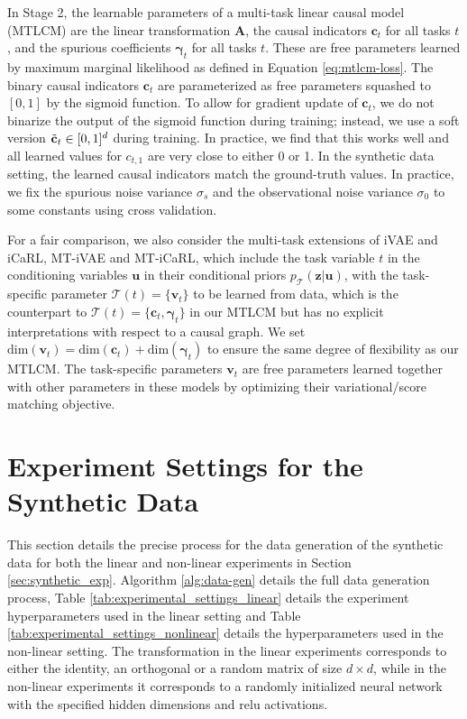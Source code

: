 \documentclass[10pt]{article} %
\theoremstyle{plain}
\theoremstyle{definition}
\begin{document}
In Stage 2, the learnable parameters of a multi-task linear causal model (MTLCM) are the linear transformation $\mathbf{A}$, the causal indicators $\mathbf{c}_t$ for all tasks $t$, and the spurious coefficients $\boldsymbol{\gamma}_t$ for all tasks $t$. These are free parameters learned by maximum marginal likelihood as defined in Equation \eqref{eq:mtlcm-loss}. The binary causal indicators $\mathbf{c}_t$ are parameterized as free parameters squashed to $[0,1]$ by the sigmoid function. To allow for gradient update of $\mathbf{c}_t$, we do not binarize the output of the sigmoid function during training; instead, we use a soft version $\Tilde{\mathbf{c}}_t\in[0,1]^d$ during training. In practice, we find that this works well and all learned values for $c_{t,1}$ are very close to either 0 or 1. In the synthetic data setting, the learned causal indicators match the ground-truth values. In practice, we fix the spurious noise variance $\sigma_s$ and the observational noise variance $\sigma_0$ to some constants using cross validation.

For a fair comparison, we also consider the multi-task extensions of iVAE and iCaRL, MT-iVAE and MT-iCaRL, which include the task variable $t$ in the conditioning variables $\mathbf{u}$ in their conditional priors $p_{\mathcal{T}}(\mathbf{z}|\mathbf{u})$, with the task-specific parameter $\mathcal{T}(t)=\{\mathbf{v}_t\}$ to be learned from data, which is the counterpart to $\mathcal{T}(t)=\{\mathbf{c}_t,\boldsymbol{\gamma}_t\}$ in our MTLCM but has no explicit interpretations with respect to a causal graph. We set $\text{dim}(\mathbf{v}_t)=\text{dim}(\mathbf{c}_t)+\text{dim}(\boldsymbol{\gamma}_t)$ to ensure the same degree of flexibility as our MTLCM. The task-specific parameters $\mathbf{v}_t$ are free parameters learned together with other parameters in these models by optimizing their variational/score matching objective.

\section{Experiment Settings for the Synthetic Data}
\label{appendix: experiment-settings-synth}
This section details the precise process for the data generation of the synthetic data for both the linear and non-linear experiments in Section \ref{sec:synthetic_exp}. Algorithm \ref{alg:data-gen} details the full data generation process, Table \ref{tab:experimental_settings_linear} details the experiment hyperparameters used in the linear setting and Table \ref{tab:experimental_settings_nonlinear} details the hyperparameters used in the non-linear setting. The transformation in the linear experiments corresponds to either the identity, an orthogonal or a random matrix of size $d\times d$, while in the non-linear experiments it corresponds to a randomly initialized neural network with the specified hidden dimensions and relu activations.
\end{document}
